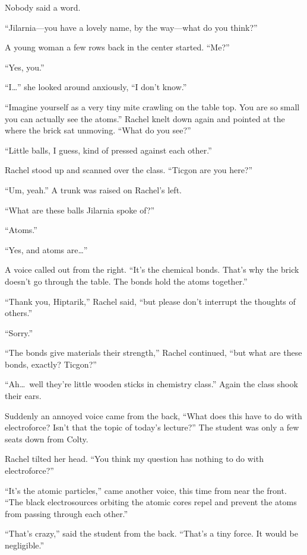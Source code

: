 Nobody said a word.

``Jilarnia---you have a lovely name, by the way---what do you think?''

A young woman a few rows back in the center started. ``Me?''

``Yes, you.''

``I\ldots'' she looked around anxiously, ``I don't know.''

``Imagine yourself as a very tiny mite crawling on the table top. You are so small you can
actually see the atoms.'' Rachel knelt down again and pointed at the where the brick sat
unmoving. ``What do you see?''

``Little balls, I guess, kind of pressed against each other.''

Rachel stood up and scanned over the class. ``Ticgon are you here?''

``Um, yeah.'' A trunk was raised on Rachel's left.

``What are these balls Jilarnia spoke of?''

``Atoms.''

``Yes, and atoms are\ldots''

A voice called out from the right. ``It's the chemical bonds. That's why the brick doesn't go
through the table. The bonds hold the atoms together.''

``Thank you, Hiptarik,'' Rachel said, ``but please don't interrupt the thoughts of others.''

``Sorry.''

``The bonds give materials their strength,'' Rachel continued, ``but what are these bonds,
exactly? Ticgon?''

``Ah\ldots\ well they're little wooden sticks in chemistry class.'' Again the class shook their
ears.

Suddenly an annoyed voice came from the back, ``What does this have to do with electroforce?
Isn't that the topic of today's lecture?'' The student was only a few seats down from Colty.

Rachel tilted her head. ``You think my question has nothing to do with electroforce?''

``It's the atomic particles,'' came another voice, this time from near the front. ``The black
electrosources orbiting the atomic cores repel and prevent the atoms from passing through each
other.''

``That's crazy,'' said the student from the back. ``That's a tiny force. It would be
negligible.''

